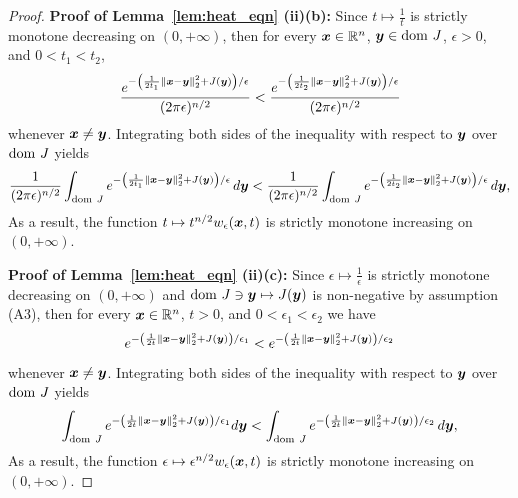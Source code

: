 \begin{proof}
\textbf{Proof of Lemma~\ref{lem:heat_eqn} (ii)(b):} Since $t\mapsto\frac{1}{t}$ is strictly monotone decreasing on $(0,+\infty)$, then for every $\boldsymbol{x}\in\mathbb{R}^n$, $\boldsymbol{y} \in \mathrm{dom~} J$, $\epsilon>0$, and $0<t_1<t_2$,
\[
\frac{e^{-\left(\frac{1}{2t_1}\left\Vert \boldsymbol{x}-\boldsymbol{y}\right\Vert _{2}^{2}+J(\boldsymbol{y})\right)/\epsilon}}{(2\pi\epsilon)^{n/2}}<\frac{e^{-\left(\frac{1}{2t_2}\left\Vert \boldsymbol{x}-\boldsymbol{y}\right\Vert _{2}^{2}+J(\boldsymbol{y})\right)/\epsilon}}{(2\pi\epsilon)^{n/2}}
\]
whenever $\boldsymbol{x}\neq\boldsymbol{y}$. Integrating both sides of the inequality with respect to $\boldsymbol{y}$ over $\mathrm{dom~} J$ yields
\[
\frac{1}{(2\pi\epsilon)^{n/2}}\int_{\mathrm{dom~} J}e^{-\left(\frac{1}{2t_1}\left\Vert \boldsymbol{x}-\boldsymbol{y}\right\Vert _{2}^{2}+J(\boldsymbol{y})\right)/\epsilon}\mathop{}\!d\boldsymbol{y}<\frac{1}{(2\pi\epsilon)^{n/2}}\int_{\mathrm{dom~} J}e^{-\left(\frac{1}{2t_2}\left\Vert \boldsymbol{x}-\boldsymbol{y}\right\Vert _{2}^{2}+J(\boldsymbol{y})\right)/\epsilon}\mathop{}\!d\boldsymbol{y},
\]
As a result, the function $t\mapsto t^{n/2}w_{\epsilon}(\boldsymbol{x},t)$ is strictly monotone increasing on $(0,+\infty)$. 

\textbf{Proof of Lemma~\ref{lem:heat_eqn} (ii)(c):} Since $\epsilon\mapsto\frac{1}{\epsilon}$ is strictly monotone decreasing on $(0,+\infty)$ and $\mathrm{dom~} J \ni \boldsymbol{y}\mapsto J(\boldsymbol{y})$ is non-negative by assumption (A3), then for every $\boldsymbol{x}\in\mathbb{R}^n$, $t>0$, and $0<\epsilon_1<\epsilon_2$ we have
\[
e^{-\left(\frac{1}{2t}\left\Vert \boldsymbol{x}-\boldsymbol{y}\right\Vert _{2}^{2}+J(\boldsymbol{y})\right)/\epsilon_1}<e^{-\left(\frac{1}{2t}\left\Vert \boldsymbol{x}-\boldsymbol{y}\right\Vert _{2}^{2}+J(\boldsymbol{y})\right)/\epsilon_2}
\]
whenever $\boldsymbol{x}\neq\boldsymbol{y}$. Integrating both sides of the inequality with respect to $\boldsymbol{y}$ over $\mathrm{dom~} J$ yields 
\[
\int_{\mathrm{dom~} J}e^{-\left(\frac{1}{2t}\left\Vert \boldsymbol{x}-\boldsymbol{y}\right\Vert _{2}^{2}+J(\boldsymbol{y})\right)/\epsilon_1}d\boldsymbol{y}<\int_{\mathrm{dom~} J}e^{-\left(\frac{1}{2t}\left\Vert \boldsymbol{x}-\boldsymbol{y}\right\Vert _{2}^{2}+J(\boldsymbol{y})\right)/\epsilon_2}\mathop{}\!d\boldsymbol{y},
\]
As a result, the function $\epsilon\mapsto\epsilon^{n/2}w_{\epsilon}(\boldsymbol{x},t)$ is strictly monotone increasing on $(0,+\infty)$.


\end{proof}
